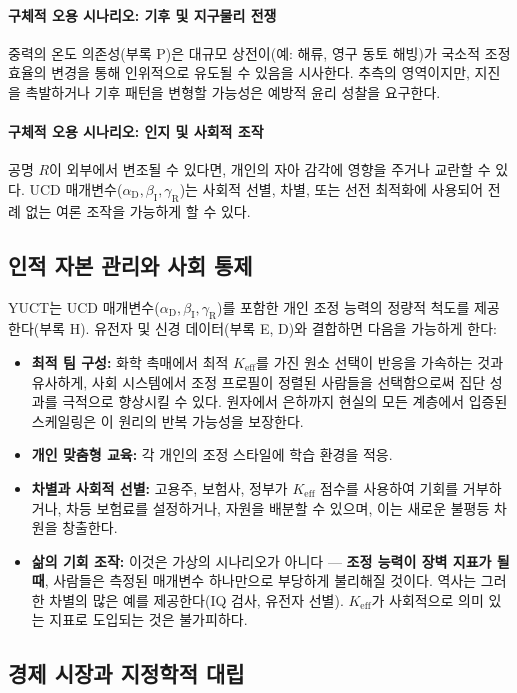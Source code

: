 \documentclass[12pt,a4paper]{article}
\theoremstyle{remark}
\newcommand{\Keff}{K_{\mathrm{eff}}}
\newcommand{\alD}{\alpha_{\mathrm{D}}}
\newcommand{\beI}{\beta_{\mathrm{I}}}
\newcommand{\gaR}{\gamma_{\mathrm{R}}}
\begin{document}
	\paragraph{구체적 오용 시나리오: 기후 및 지구물리 전쟁}
	중력의 온도 의존성(부록 P)은 대규모 상전이(예: 해류, 영구 동토 해빙)가 국소적 조정 효율의 변경을 통해 인위적으로 유도될 수 있음을 시사한다. 추측의 영역이지만, 지진을 촉발하거나 기후 패턴을 변형할 가능성은 예방적 윤리 성찰을 요구한다.
	
	\paragraph{구체적 오용 시나리오: 인지 및 사회적 조작}
	공명 \(R\)이 외부에서 변조될 수 있다면, 개인의 자아 감각에 영향을 주거나 교란할 수 있다. UCD 매개변수(\(\alD,\beI,\gaR\))는 사회적 선별, 차별, 또는 선전 최적화에 사용되어 전례 없는 여론 조작을 가능하게 할 수 있다.
	
	\subsection{인적 자본 관리와 사회 통제}
	\label{subsec:human}
	
	YUCT는 UCD 매개변수(\(\alD,\beI,\gaR\))를 포함한 개인 조정 능력의 정량적 척도를 제공한다(부록 H). 유전자 및 신경 데이터(부록 E, D)와 결합하면 다음을 가능하게 한다:
	\begin{itemize}[leftmargin=*]
		\item \textbf{최적 팀 구성:} 화학 촉매에서 최적 \(\Keff\)를 가진 원소 선택이 반응을 가속하는 것과 유사하게, 사회 시스템에서 조정 프로필이 정렬된 사람들을 선택함으로써 집단 성과를 극적으로 향상시킬 수 있다. 원자에서 은하까지 현실의 모든 계층에서 입증된 스케일링은 이 원리의 반복 가능성을 보장한다.
		\item \textbf{개인 맞춤형 교육:} 각 개인의 조정 스타일에 학습 환경을 적응.
		\item \textbf{차별과 사회적 선별:} 고용주, 보험사, 정부가 \(\Keff\) 점수를 사용하여 기회를 거부하거나, 차등 보험료를 설정하거나, 자원을 배분할 수 있으며, 이는 새로운 불평등 차원을 창출한다.
		\item \textbf{삶의 기회 조작:} 이것은 가상의 시나리오가 아니다 — \textbf{조정 능력이 장벽 지표가 될 때}, 사람들은 측정된 매개변수 하나만으로 부당하게 불리해질 것이다. 역사는 그러한 차별의 많은 예를 제공한다(IQ 검사, 유전자 선별). \(\Keff\)가 사회적으로 의미 있는 지표로 도입되는 것은 불가피하다.
	\end{itemize}
	
	\subsection{경제 시장과 지정학적 대립}
	\label{subsec:econ}
	
\end{document}
